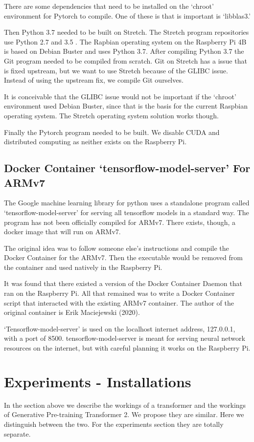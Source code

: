 There are some dependencies that need to be installed on the `chroot' environment for Pytorch to compile. One of these is that is important is `libblas3.'

Then Python 3.7 needed to be built on Stretch. The Stretch program repositories use Python 2.7 and 3.5 . The Rapbian operating system on the Raspberry Pi 4B is based on Debian Buster and uses Python 3.7. After compiling Python 3.7 the Git program needed to be compiled from scratch. Git on Stretch has a issue that is fixed upstream, but we want to use Stretch because of the GLIBC issue. Instead of using the upstream fix, we compile Git ourselves.

It is conceivable that the GLIBC issue would not be important if the `chroot' environment used Debian Buster, since that is the basis for the current Raspbian operating system. The Stretch operating system solution works though.

Finally the Pytorch program needed to be built. We disable CUDA and distributed computing as neither exists on the Raspberry Pi.

\subsection*{Docker Container `tensorflow-model-server' For ARMv7}
The Google machine learning library for python uses a standalone program called `tensorflow-model-server' for serving all tensorflow models in a standard way. The program has not been officially compiled for ARMv7. There exists, though, a docker image that will run on ARMv7.

The original idea was to follow someone else's instructions and compile the Docker Container for the ARMv7. Then the executable would be removed from the container and used natively in the Raspberry Pi.

It was found that there existed a version of the Docker Container Daemon that ran on the Raspberry Pi. All that remained was to write a Docker Container script that interacted with the existing ARMv7 container. The author of the original container is Erik Maciejewski (2020)\cite{2020Maciejewski}.

`Tensorflow-model-server' is used on the localhost internet address, 127.0.0.1, with a port of 8500. tensorflow-model-server is meant for serving neural network resources on the internet, but with careful planning it works on the Raspberry Pi.

\section{Experiments - Installations}
In the section above we describe the workings of a transformer and the workings of Generative Pre-training Transformer 2. We propose they are similar. Here we distinguish between the two. For the experiments section they are totally separate.

